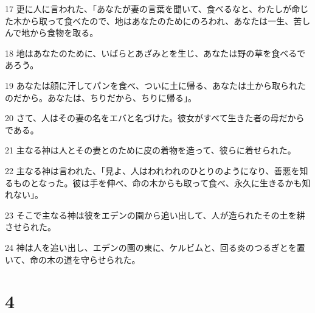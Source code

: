 \par 17 更に人に言われた、「あなたが妻の言葉を聞いて、食べるなと、わたしが命じた木から取って食べたので、地はあなたのためにのろわれ、あなたは一生、苦しんで地から食物を取る。
\par 18 地はあなたのために、いばらとあざみとを生じ、あなたは野の草を食べるであろう。
\par 19 あなたは顔に汗してパンを食べ、ついに土に帰る、あなたは土から取られたのだから。あなたは、ちりだから、ちりに帰る」。
\par 20 さて、人はその妻の名をエバと名づけた。彼女がすべて生きた者の母だからである。
\par 21 主なる神は人とその妻とのために皮の着物を造って、彼らに着せられた。
\par 22 主なる神は言われた、「見よ、人はわれわれのひとりのようになり、善悪を知るものとなった。彼は手を伸べ、命の木からも取って食べ、永久に生きるかも知れない」。
\par 23 そこで主なる神は彼をエデンの園から追い出して、人が造られたその土を耕させられた。
\par 24 神は人を追い出し、エデンの園の東に、ケルビムと、回る炎のつるぎとを置いて、命の木の道を守らせられた。

\chapter{4}

